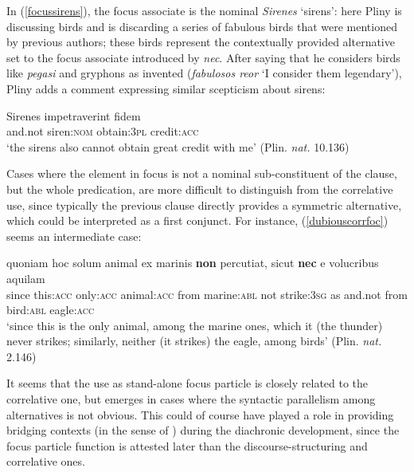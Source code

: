 \documentclass[output=paper]{langsci/langscibook}
\begin{document}
\noindent In (\ref{focussirens}), the focus associate is the nominal {\emph{Sirenes}} `sirens': here Pliny is discussing birds and is discarding a series of fabulous birds that were mentioned by previous authors; these birds represent the contextually provided alternative set to the focus associate introduced by {\emph{nec}}. After saying that he considers birds like {\emph{pegasi}} and gryphons as invented ({\emph{fabulosos reor}} `I consider them legendary'), Pliny adds a comment expressing similar scepticism about sirens:

{\begin{exe}
\ex \label{focussirens}  Sirenes impetraverint fidem\\
and.not siren:{\textsc{nom}} obtain:{\textsc{3pl}} credit:{\textsc{acc}}\\
\glt `the sirens also cannot obtain great credit with me' (Plin. {\emph{nat.}} 10.136)
\end{exe}}

\noindent Cases where the element in focus is not a nominal sub-constituent of the clause, but the whole predication, are more difficult to distinguish from the correlative use, since typically the previous clause directly provides a symmetric alternative, which could be interpreted as a first conjunct. For instance, (\ref{dubiouscorrfoc}) seems an intermediate case:

{\begin{exe}
\ex \label{dubiouscorrfoc} \gll quoniam hoc solum animal ex marinis {\textbf{non}} percutiat, sicut {\textbf{nec}} e volucribus aquilam\\
since this:{\textsc{acc}} only:{\textsc{acc}} animal:{\textsc{acc}} from marine:{\textsc{abl}} not strike:{\textsc{3sg}} as and.not from bird:{\textsc{abl}} eagle:{\textsc{acc}}\\

`since this is the only animal, among the marine ones, which it (the thunder) never strikes; similarly, neither (it strikes) the eagle, among birds' (Plin. {\emph{nat.}} 2.146)
\end{exe}}

\noindent It seems that the use as stand-alone focus particle is closely related to the correlative one, but emerges in cases where the syntactic parallelism among alternatives is not obvious. This could of course have played a role in providing bridging contexts (in the sense of \citealt{Heine02}) during the diachronic development, since the focus particle function is attested later than the discourse-structuring and correlative ones.
\end{document}
